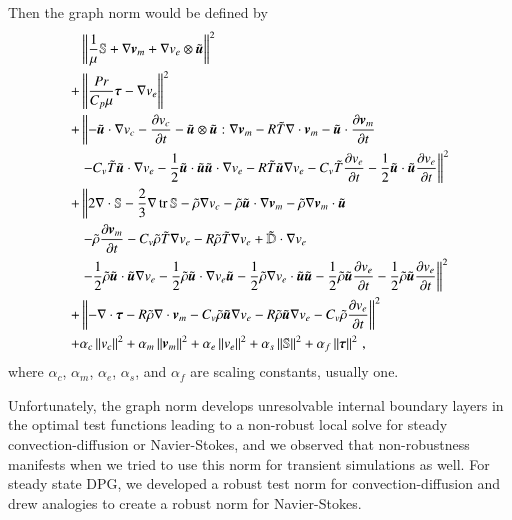 \documentclass[preprint,12pt]{elsarticle}
\begin{document}
Then the graph norm would be defined by
\begin{equation}
\begin{aligned}
&\left\| \frac{1}{\mu}\mathbb{S}+\nabla\boldsymbol v_m+\nabla v_e\otimes\tilde{\boldsymbol u} \right\|^2\\
+&\left\| \frac{Pr}{C_p\mu}\boldsymbol\tau-\nabla v_e \right\|^2\\
+&\left\|
-\tilde{\boldsymbol u}\cdot\nabla v_c-\frac{\partial v_c}{\partial t}-\tilde{\boldsymbol u}\otimes\tilde{\boldsymbol u}:\nabla\boldsymbol v_m
-R\tilde T\nabla\cdot\boldsymbol v_m-\tilde{\boldsymbol u}\cdot\frac{\partial\boldsymbol v_m}{\partial t}\right.\\
&\left.-C_v\tilde T\tilde{\boldsymbol u}\cdot\nabla v_e-\frac{1}{2}\tilde{\boldsymbol u}\cdot\tilde{\boldsymbol u}\tilde{\boldsymbol u}\cdot\nabla v_e
-R\tilde T\tilde{\boldsymbol u}\nabla v_e
-C_v\tilde T\frac{\partial v_e}{\partial t}-\frac{1}{2}\tilde{\boldsymbol u}\cdot\tilde{\boldsymbol u}\frac{\partial v_e}{\partial t}
\right\|^2\\
+&\left\|2\nabla\cdot\mathbb{S}-\frac{2}{3}\nabla\operatorname*{tr}{\mathbb{S}}
-\tilde\rho\nabla v_c
-\tilde\rho\tilde{\boldsymbol u}\cdot\nabla\boldsymbol v_m-\tilde\rho\nabla\boldsymbol v_m\cdot\tilde{\boldsymbol u}
\right.\\
&\left.
-\tilde\rho\frac{\partial\boldsymbol v_m}{\partial t}
-C_v\tilde\rho\tilde T\nabla v_e
-R\tilde\rho\tilde T\nabla v_e
+\tilde{\mathbb{D}}\cdot\nabla v_e
\right.\\
&\left.
-\frac{1}{2}\tilde\rho\tilde{\boldsymbol u}\cdot\tilde{\boldsymbol u}\nabla v_e
-\frac{1}{2}\tilde\rho\tilde{\boldsymbol u}\cdot\nabla v_e\tilde{\boldsymbol u}
-\frac{1}{2}\tilde\rho\nabla v_e\cdot\tilde{\boldsymbol u}\tilde{\boldsymbol u}
-\frac{1}{2}\tilde\rho\tilde{\boldsymbol u}\frac{\partial v_e}{\partial t}
-\frac{1}{2}\tilde\rho\tilde{\boldsymbol u}\frac{\partial v_e}{\partial t}
\right\|^2\\
+&\left\|-\nabla\cdot\boldsymbol\tau
-R\tilde\rho\nabla\cdot\boldsymbol v_m
-C_v\tilde\rho\tilde{\boldsymbol u}\nabla v_e
-R\tilde\rho\tilde{\boldsymbol u}\nabla v_e
-C_v\tilde\rho\frac{\partial v_e}{\partial t}
\right\|^2\\
+&\alpha_c\left\| v_c \right\|^2
+\alpha_m\left\| \boldsymbol v_m \right\|^2
+\alpha_e\left\| v_e \right\|^2
+\alpha_s\left\| \mathbb{S} \right\|^2
+\alpha_f\left\| \boldsymbol\tau \right\|^2
\,,
\end{aligned}
\end{equation}
where $\alpha_c$, $\alpha_m$, $\alpha_e$, $\alpha_s$, and $\alpha_f$ are scaling constants, usually one.

Unfortunately, the graph norm develops unresolvable internal boundary layers in the optimal test functions leading to a non-robust
local solve for steady convection-diffusion or Navier-Stokes,
and we observed that non-robustness manifests when we tried to use this norm for transient simulations as well.
For steady state DPG, we developed a robust test norm for convection-diffusion and drew analogies to create 
a robust norm for Navier-Stokes.
\end{document}
